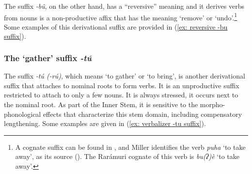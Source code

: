 The suffix \textit{-bû}, on the other hand, has a ``reversive'' meaning and it derives verbs from nouns is a non-productive affix that has the meaning ‘remove’ or ‘undo’.\footnote{A cognate suffix can be found in , and Miller identifies the verb \textit{puha} ‘to take away’, as its source (\citeyear[151]{miller1996guarijio}). The Rarámuri cognate of this verb is \textit{bu(ʔ)è} ‘to take away’.} Some examples of this derivational suffix are provided in (\ref{ex: reversive -bu suffix}).

\ea\label{ex: reversive -bu suffix}

  \z
\z

\subsubsection{The `gather' suffix \textit{-tú}}
\label{subsubsec: the verbalizer -tu suffix}

The suffix \textit{-tú (-rú)}, which means ‘to gather’ or ‘to bring’, is another derivational suffix that attaches to nominal roots to form verbs. It is an unproductive suffix restricted to attach to only a few nouns. It is always stressed, it occurs next to the nominal root. As part of the Inner Stem, it is sensitive to the morpho-phonological effects that characterize this stem domain, including compensatory lengthening. Some examples are given in (\ref{ex: verbalizer -tu suffix}).

